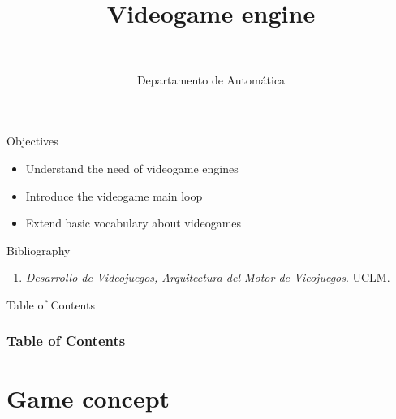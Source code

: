 \documentclass[10pt,compress]{beamer} %
\title[Videogame engine]{Videogame engine}
\author{\asignatura\\\carrera}
\institute{}
\date{Departamento de Automática}
\begin{document}
{\titlepageBlue
    \begin{frame}
        \titlepage
    \end{frame}
}

\begin{frame}[plain]{}
   \begin{block}{Objectives}
   \begin{itemize}
        \item Understand the need of videogame engines
		\item Introduce the videogame main loop
		\item Extend basic vocabulary about videogames
	\end{itemize}
	\end{block}

   \begin{block}{Bibliography}
      \begin{enumerate}
          \item  \textit{Desarrollo de Videojuegos, Arquitectura del Motor de Vieojuegos}. UCLM.
      \end{enumerate} 
   \end{block}
\end{frame}

{
\begin{frame}[shrink]{Table of Contents}
 \frametitle{Table of Contents}
 \tableofcontents
\end{frame}
}

\section{Game concept}
\end{document}
